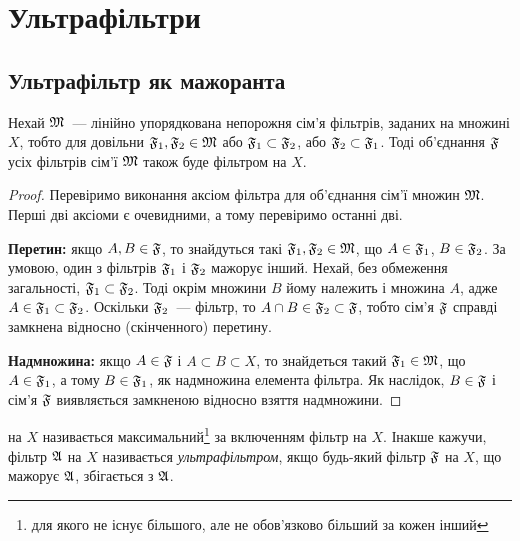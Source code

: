 \chapter{Ультрафільтри}

\section{Ультрафільтр як мажоранта} %

\begin{lemma}
    \label{lem:linear-filter-set-upper-bound}
    Нехай $\frak M$~--- лінійно упорядкована непорожня сім'я фільтрів, заданих на множині $X$, тобто для довільни $\frak F_1, \frak F_2 \in \frak M$ або $\frak F_1 \subset \frak F_2$, або $\frak F_2 \subset \frak F_1$.  Тоді об'єднання $\frak F$ усіх фільтрів сім'ї $\frak M$ також буде фільтром на $X$.
\end{lemma}
\begin{proof}
    Перевіримо виконання аксіом фільтра для об'єднання сім'ї множин $\frak M$. Перші дві аксіоми є очевидними, а тому перевіримо останні дві. 
    
    \textbf{Перетин:} якщо $A, B \in \frak F$, то знайдуться такі $\frak F_1, \frak F_2 \in \frak M$, що $A \in \frak F_1$, $B \in \frak F_2$. За умовою, один з фільтрів $\frak F_1$ і $\frak F_2$ мажорує інший. Нехай, без обмеження загальності, $\frak F_1 \subset \frak F_2$.  Тоді окрім множини $B$ йому належить і множина $A$, адже $A \in \frak F_1 \subset \frak F_2$. Оскільки $\frak F_2$~--- фільтр, то $A \cap B \in \frak F_2 \subset \frak F$, тобто сім'я $\frak F$ справді замкнена відносно (скінченного) перетину. 
    
    \textbf{Надмножина:} якщо $A \in \frak F$ і $A \subset B \subset X$, то знайдеться такий $\frak F_1 \in \frak M$, що $A \in \frak F_1$, а тому $B \in \frak F_1$, як надмножина елемента фільтра.  Як наслідок, $B \in \frak F$ і сім'я $\frak F$ виявляється замкненою відносно взяття надмножини.
\end{proof}

\begin{definition}
     на $X$ називається максимальний\footnote{для якого не існує більшого, але не обов'язково більший за кожен інший} за включенням фільтр на $X$.  Інакше кажучи, фільтр $\frak A$ на $X$ називається \emph{ультрафільтром}, якщо будь-який фільтр $\frak F$ на $X$, що мажорує $\frak A$, збігається з $\frak A$.
\end{definition}

